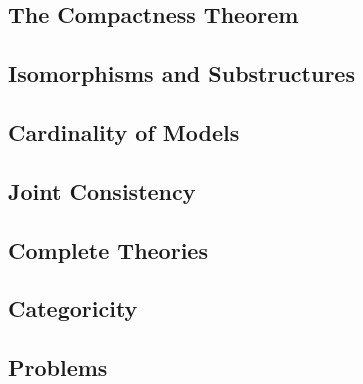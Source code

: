\subsection{The Compactness Theorem}


\subsection{Isomorphisms and Substructures}


\subsection{Cardinality of Models}


\subsection{Joint Consistency}


\subsection{Complete Theories}


\subsection{Categoricity}


\subsection{Problems}
